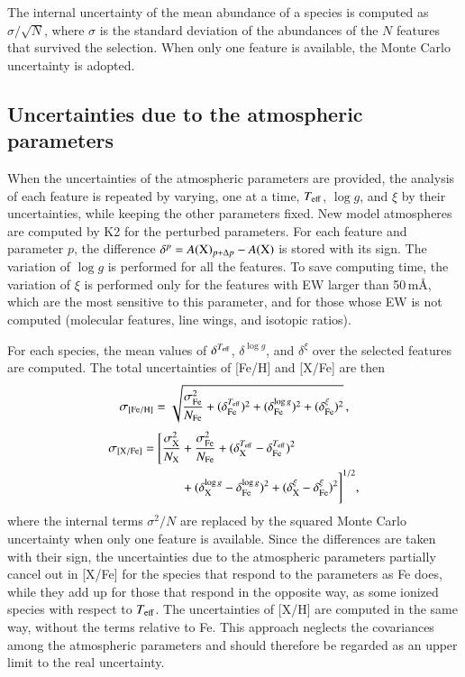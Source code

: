 \documentclass{aa}
\begin{document}
The internal uncertainty of the mean abundance of a species is computed
as $\sigma/\sqrt{N}$, where $\sigma$ is the standard deviation of the
abundances of the $N$ features that survived the selection. When only
one feature is available, the Monte Carlo uncertainty is adopted.

\subsection{Uncertainties due to the atmospheric parameters}
\label{sec:errors_params}

When the uncertainties of the atmospheric parameters are provided, the
analysis of each feature is repeated by varying, one at a time, $T_{\rm
eff}$, $\log g$, and $\xi$ by their uncertainties, while keeping the
other parameters fixed. New model atmospheres are computed by K2 for
the perturbed parameters. For each feature and parameter $p$, the
difference $\delta^{p}=A({\rm X})_{p+\Delta p}-A({\rm X})$ is stored
with its sign. The variation of $\log g$ is performed for all the
features. To save computing time, the variation of $\xi$ is performed
only for the features
with EW larger than 50\,m\AA, which are the most sensitive to this
parameter, and for those whose EW is not computed (molecular features,
line wings, and isotopic ratios).

For each species, the mean values of $\delta^{T_{\rm eff}}$,
$\delta^{\log g}$, and $\delta^{\xi}$ over the selected features are
computed. The total uncertainties of [Fe/H] and [X/Fe] are then
\begin{equation}
\sigma_{\rm [Fe/H]} = \sqrt{\frac{\sigma_{\rm Fe}^2}{N_{\rm Fe}} +
(\delta^{T_{\rm eff}}_{\rm Fe})^2 + (\delta^{\log g}_{\rm Fe})^2 +
(\delta^{\xi}_{\rm Fe})^2}\,,
\label{eq:err_feh}
\end{equation}
\begin{equation}
\begin{split}
\sigma_{\rm [X/Fe]} = \Bigg[\frac{\sigma_{\rm X}^2}{N_{\rm X}} &+
\frac{\sigma_{\rm Fe}^2}{N_{\rm Fe}} +
(\delta^{T_{\rm eff}}_{\rm X}-\delta^{T_{\rm eff}}_{\rm Fe})^2 \\
&+ (\delta^{\log g}_{\rm X}-\delta^{\log g}_{\rm Fe})^2 +
(\delta^{\xi}_{\rm X}-\delta^{\xi}_{\rm Fe})^2\Bigg]^{1/2},
\end{split}
\label{eq:err_xfe}
\end{equation}
where the internal terms $\sigma^2/N$ are replaced by the squared
Monte Carlo uncertainty when only one feature is available. Since the
differences are taken with their sign, the uncertainties due to the
atmospheric parameters partially cancel out in [X/Fe] for the species
that respond to the parameters as Fe does, while they add up for those
that respond in the opposite way, as some ionized species with respect
to $T_{\rm eff}$. The uncertainties of [X/H] are computed in the same
way, without the terms relative to Fe. This approach neglects the
covariances among the atmospheric parameters and should therefore be
regarded as an upper limit to the real uncertainty.
\end{document}
